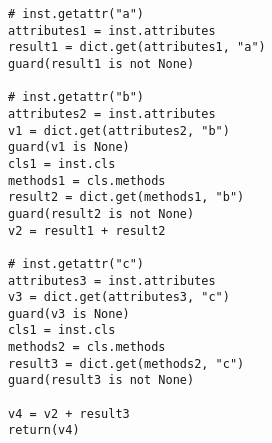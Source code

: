 \begin{Verbatim}
# inst.getattr("a")
attributes1 = inst.attributes
result1 = dict.get(attributes1, "a")
guard(result1 is not None)

# inst.getattr("b")
attributes2 = inst.attributes
v1 = dict.get(attributes2, "b")
guard(v1 is None)
cls1 = inst.cls
methods1 = cls.methods
result2 = dict.get(methods1, "b")
guard(result2 is not None)
v2 = result1 + result2

# inst.getattr("c")
attributes3 = inst.attributes
v3 = dict.get(attributes3, "c")
guard(v3 is None)
cls1 = inst.cls
methods2 = cls.methods
result3 = dict.get(methods2, "c")
guard(result3 is not None)

v4 = v2 + result3
return(v4)
\end{Verbatim}
